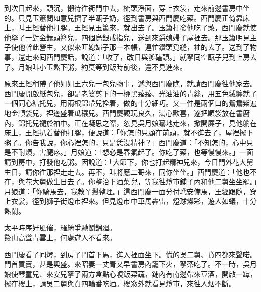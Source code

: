 到次日起來，頭沉，懶待徃衙門中去，梳頭淨面，穿上衣裳，走來前邊書房中坐的。只見玉簫問如意兒擠了半甌子奶，徑到書房與西門慶吃藥。西門慶正倚靠床上，叫王經替他打腿。王經見玉簫來，就出去了。玉簫打發他吃了藥，西門慶就使他拏了一對金鑲頭簪兒，四個烏銀戒指兒，送到來爵媳婦子屋裡去。那玉簫明見主子使他幹此營生，又似來旺媳婦子那一本帳，{}連忙鑽頭覓縫，袖的去了。送到了物事，還走來囘西門慶話，說道：「收了，改日與爹磕頭。」就拏囘空甌子兒到上房去了。月娘叫小玉熬下粥，約莫等到飯時前後，還不見進來。

原來王經稍帶了他姐姐王六兒一包兒物事，遞與西門慶瞧，就請西門慶徃他家去。西門慶開啟紙包兒，卻是老婆剪下的一桺黑臻臻、光油油的青絲，用五色絨纏就了一個同心結托兒，用兩根錦帶兒拴着，做的十分細巧。{}又一件是兩個口的鴛鴦紫遍地金順袋兒，裡邊盛着瓜穰兒。西門慶觀玩良久，滿心歡喜，遂把順袋放在書廚內，錦托兒褪於袖中。正在凝思之際，忽見吳月娘驀地走來，掀開簾子，見他躺在床上，王經扒着替他打腿，便說道：「你怎的只顧在前頭，就不進去了，屋裡擺下粥了。你告我說，你心裡怎的，只是恁沒精神？」{}西門慶道：「不知怎的，心中只是不耐煩，害腿疼。」月娘道：「想必是春氣起了。你吃了藥，也等慢慢來。」一面請到房中，打發他吃粥。因說道：「大節下，你也打起精神兒來，今日門外花大舅生日，請你徃那裡走走去。再不，叫將應二哥來，同你坐坐。」西門慶道：「他也不在，與花大舅做生日去了。你整治下酒菜兒，等我徃燈市鋪子內和他二舅坐坐罷。」月娘道：「你騎馬去，我教丫鬟整理。」這西門慶一面分付玳安備馬，王經跟隨，穿上衣裳，徑到獅子街燈市裡來。但見燈市中車馬轟雷，燈球燦彩，遊人如蟻，十分熱鬧。

\begin{myquote} 
太平時序好風催，羅綺爭馳鬪錦廻。\\鰲山高聳青雲上，何處遊人不看來。
\end{myquote} 

西門慶看了囘燈，到房子門首下馬，進入裡面坐下。慌的吳二舅、賁四都來聲喏。門首買賣，甚是興盛。來昭妻一丈青又早書房內籠下火，拏茶吃了。不一時，吳月娘使琴童兒、來安兒拏了兩方盒點心嗄飯菜蔬，鋪內有南邊帶來豆酒，開啟一罈，擺在樓上，請吳二舅與賁四輪番吃酒。樓窓外就看見燈市，來徃人烟不斷。

